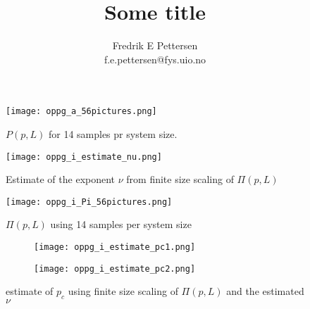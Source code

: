 \documentclass[a4paper,english, 10pt, twoside]{article}
\title{Some title}
\author{Fredrik E Pettersen\\ f.e.pettersen@fys.uio.no}
\begin{document}
\maketitle
% 
% 

\begin{figure}
\centering
\texttt{[image: oppg\_a\_56pictures.png]}
\caption{$P(p,L)$ for 14 samples pr system size.}
\end{figure}

\begin{figure}
\centering
\texttt{[image: oppg\_i\_estimate\_nu.png]}
\caption{Estimate of the exponent $\nu$ from finite size scaling of $\Pi(p,L)$}
\end{figure}
% 

\begin{figure}
\centering
\texttt{[image: oppg\_i\_Pi\_56pictures.png]}
\caption{$\Pi(p,L)$ using 14 samples per system size}
\end{figure}

\begin{figure}[H]
\centering
  \begin{subfigure}[b]{\textwidth}
    \texttt{[image: oppg\_i\_estimate\_pc1.png]}
    \caption{}
  \end{subfigure}
  
  \begin{subfigure}[b]{\textwidth}
    \texttt{[image: oppg\_i\_estimate\_pc2.png]}
    \caption{}
  \end{subfigure}
  \caption{estimate of $p_c$ using finite size scaling of $\Pi(p,L)$ and the estimated $\nu$}
\end{figure}

\end{document}
